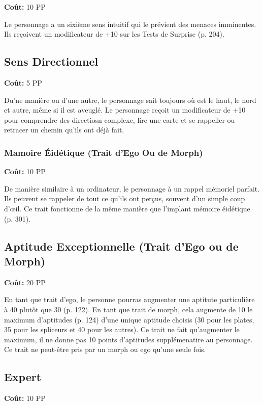 \textbf{Coût:} 10 PP 

Le personnage a un sixième sens intuitif qui le prévient des menaces imminentes. Ils reçoivent un modificateur de +10 sur les Tests de Surprise (p. 204). 

\subsection{Sens Directionnel} \label{sec:traits-direction-sense} 

\textbf{Coût:} 5 PP 

Du'ne manière ou d'une autre, le personnage sait toujours où est le haut, le nord et autre, même si il est aveuglé. Le personnage reçoit un modificateur de +10 pour comprendre des directiosn complexe, lire une carte et se rappeller ou retracer un chemin qu'ils ont déjà fait. 

\subsubsection{Mamoire Éidétique (Trait d'Ego Ou de Morph)} \label{sec:traits-eidetic-memory} \textbf{Coût:} 10 PP 

De manière similaire à un ordinateur, le personnage à un rappel mémoriel parfait. Ils peuvent se rappeler de tout ce qu'ils ont perçus, souvent d'un simple coup d'œil. Ce trait fonctionne de la même manière que l'implant mémoire éidétique (p. 301). 

\subsection{Aptitude Exceptionnelle (Trait d'Ego ou de Morph)} \label{sec:traits-exceptional-aptitude} 
\textbf{Coût:} 20 PP 

En tant que trait d'ego, le personne pourras augmenter une aptitute particulière à 40 plutôt que 30 (p. 122). En tant que trait de morph, cela augmente de 10 le maximum d'aptitudes (p. 124) d'une unique aptitude choisis (30 pour les plates, 35 pour les spliceurs et 40 pour les autres). Ce trait ne fait qu'augmenter le maximum, il ne donne pas 10 points d'aptitudes supplémenatire au personnage. Ce trait ne peut-être pris par un morph ou ego qu'une seule fois. 

\subsection{Expert} \label{sec:traits-expert} 

\textbf{Coût:} 10 PP 

